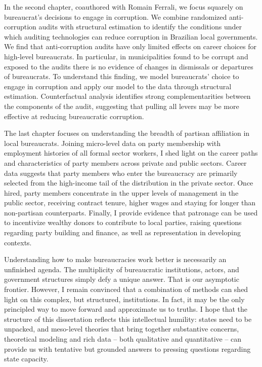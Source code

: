 In the second chapter, coauthored with Romain Ferrali, we focus squarely on bureaucrat's decisions to engage in corruption. We combine randomized anti-corruption audits with structural estimation to identify the conditions under which auditing technologies can reduce corruption in Brazilian local governments. We find that anti-corruption audits have only limited effects on career choices for high-level bureaucrats. In particular, in municipalities found to be corrupt and exposed to the audits there is no evidence of changes in dismissals or departures of bureaucrats. To understand this finding, we model bureaucrats' choice to engage in corruption and apply our model to the data through structural estimation. Counterfactual analysis identifies strong complementarities between the components of the audit, suggesting that pulling all levers may be more effective at reducing bureaucratic corruption.

The last chapter focuses on understanding the breadth of partisan affiliation in local bureaucrats. Joining micro-level data on party membership with employment histories of all formal sector workers, I shed light on the career paths and characteristics of party members across private and public sectors. Career data suggests that party members who enter the bureaucracy are primarily selected from the high-income tail of the distribution in the private sector. Once hired, party members concentrate in the upper levels of management in the public sector, receiving contract tenure, higher wages and staying for longer than non-partisan counterparts. Finally, I provide evidence that patronage can be used to incentivize wealthy donors to contribute to local parties, raising questions regarding party building and finance, as well as representation in developing contexts.

Understanding how to make bureaucracies work better is necessarily an unfinished agenda. The multiplicity of bureaucratic institutions, actors, and government structures simply defy a unique answer. That is our asymptotic frontier. However, I remain convinced that a combination of methods can shed light on this complex, but structured, institutions. In fact, it may be the only principled way to move forward and approximate us to truths. I hope that the structure of this dissertation reflects this intellectual humility: states need to be unpacked, and meso-level theories that bring together substantive concerns, theoretical modeling and rich data -- both qualitative and quantitative -- can provide us with tentative but grounded answers to pressing questions regarding state capacity. 

